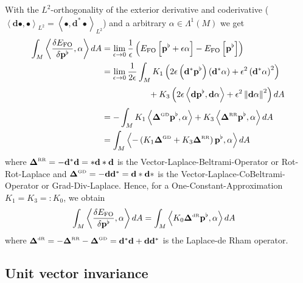 \documentclass[a4paper,11pt]{scrartcl}
\newcommand{\exd}{\mathbf{d}}
\newcommand{\excod}{\exd^{*}} %
\newcommand{\M}{M}
\newcommand{\dA}{dA}
\newcommand{\pfl}{\mathbf{p}^{\flat}}
\newcommand{\EOS}{E_{\text{FO}}}
\newcommand{\LB}{\boldsymbol{\Delta}^{\text{\tiny RR}}}
\newcommand{\LCB}{\boldsymbol{\Delta}^{\text{\tiny GD}}}
\newcommand{\LDR}{\boldsymbol{\Delta}^{\text{\tiny dR}}}
\begin{document}
  With the  \( L^{2} \)-orthogonality of the exterior derivative and coderivative 
  (\( \left\langle \exd\bullet, \bullet  \right\rangle_{L^{2}} = \left\langle \bullet,\excod\bullet \right\rangle_{L^{2}} \))
  and a arbitrary \( \alpha\in\Lambda^{1}(M) \) we get
  \begin{align}
    \int_{\M} \left\langle\frac{\delta\EOS}{\delta\pfl} , \alpha \right\rangle \dA
      &= \lim_{\epsilon\rightarrow 0} \frac{1}{\epsilon}\left( \EOS\left[ \pfl + \epsilon\alpha \right] - \EOS\left[ \pfl\right]\right) \\
      &=  \lim_{\epsilon\rightarrow 0} \frac{1}{2\epsilon} \int_{\M} 
                K_{1}\left( 2\epsilon \left( \excod\pfl \right)\left( \excod\alpha \right) 
                            + \epsilon^{2}\left( \excod\alpha \right)^{2} \right) \\
      &\phantom{= \lim_{\epsilon\rightarrow 0} \frac{1}{2\epsilon} \int_{\M}}
                +K_{3}\left(2\epsilon\left\langle \exd\pfl, \exd\alpha \right\rangle
                            + \epsilon^{2}\left\| \exd\alpha \right\|^{2}\right)\dA \\
      &= -\int_{\M} K_{1} \left\langle \LCB\pfl, \alpha \right\rangle + K_{3} \left\langle \LB\pfl, \alpha \right\rangle \dA \\
      &= \int_{\M} \left\langle -\left( K_{1}\LCB + K_{3}\LB\right)\pfl , \alpha \right\rangle \dA
  \end{align}
  where \( \LB = -\excod\exd = *\exd *\exd  \) is the Vector-Laplace-Beltrami-Operator or Rot-Rot-Laplace 
  and \( \LCB = - \exd\excod = \exd * \exd * \) is the Vector-Laplace-CoBeltrami-Operator or Grad-Div-Laplace.
  Hence, for a One-Constant-Approximation \( K_{1} = K_{3} =: K_{0} \), we obtain
  \begin{align}
    \int_{\M} \left\langle\frac{\delta\EOS}{\delta\pfl} , \alpha \right\rangle \dA
     &= \int_{\M} \left\langle K_{0}\LDR\pfl , \alpha \right\rangle \dA
  \end{align}
  where \( \LDR = -\LB - \LCB = \excod\exd + \exd\excod\) is the Laplace-de Rham operator.
  
  \subsection{Unit vector invariance}
  
\end{document}
